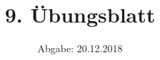 
\usepackage{longtable}
\usepackage{wrapfig}
\usepackage{ dsfont }
\usepackage{tcolorbox}
\subject{SMD-Abgabe}
\title{9. Übungsblatt}
\date{%
  Abgabe: 20.12.2018
}


  \setlength{\parindent}{0em}
  \maketitle
  \thispagestyle{empty}
  \newpage

  \newenvironment{console1}[1]
  {\begin{center}
  \begin{minipage}[t]{0.99\linewidth}
  \begin{tcolorbox}[colback=gray!5,colframe=black!40!black,title= Ausgabe des Programms: #1 ]
    }
    {
  \end{tcolorbox}
  \end{minipage}
  \end{center}
  }

%
%




